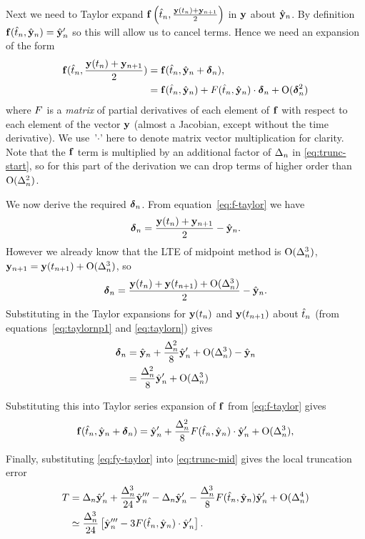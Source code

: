 Next we need to Taylor expand ${\mathbf{f}}\left( \hat{t}_n, \frac{\mathbf{y}(t_n) + \mathbf{y}_{n+1}}{2} \right)$ in $\mathbf{y}$ about $\hat{\mathbf{y}}_n$.
By definition ${\mathbf{f}}(\hat{t}_n, \hat{\mathbf{y}}_n) = \hat{\mathbf{y}}_n'$ so this will allow us to cancel terms.
Hence we need an expansion of the form
\begin{align}
 {\mathbf{f}}(\hat{t}_n, \frac{\mathbf{y}(t_n) + \mathbf{y}_{n+1}}{2}) &= {\mathbf{f}}(\hat{t}_n, \hat{\mathbf{y}}_n + \mbox{\boldmath$\delta$}_{n}),
 \notag \\
 &= {\mathbf{f}}(\hat{t}_n, \hat{\mathbf{y}}_n) + F(\hat{t}_n, \hat{\mathbf{y}}_n) \cdot \mbox{\boldmath$\delta$}_{n}  + \text{O}(\mbox{\boldmath$\delta$}_{n}^2)
 \label{eq:f-taylor}
\end{align}
where $F$ is a \emph{matrix} of partial derivatives of each element of ${\mathbf{f}}$ with respect to each element of the vector $\mathbf{y}$ (\ie almost a Jacobian, except without the time derivative).
We use~'$\cdot$' here to denote matrix vector multiplication for clarity.
Note that the ${\mathbf{f}}$ term is multiplied by an additional factor of $\Delta_{n}$ in \eqref{eq:trunc-start}, so for this part of the derivation we can drop terms of higher order than $\text{O}(\Delta_{n}^2)$.

We now derive the required $\mbox{\boldmath$\delta$}_{n}$.
From equation~\eqref{eq:f-taylor} we have
\begin{equation}
  \mbox{\boldmath$\delta$}_{n} = \frac{\mathbf{y}(t_n) + \mathbf{y}_{n+1}}{2} - \hat{\mathbf{y}}_n.
\end{equation}
However we already know that the LTE of midpoint method is $\text{O}(\Delta_{n}^3)$, \ie $\mathbf{y}_{n+1} = \mathbf{y}(t_{n+1}) + \text{O}(\Delta_{n}^3)$, so
\begin{equation}
   \mbox{\boldmath$\delta$}_{n} = \frac{\mathbf{y}(t_n) + \mathbf{y}(t_{n+1}) + \text{O}(\Delta_{n}^3)}{2} - \hat{\mathbf{y}}_n.
\end{equation}
Substituting in the Taylor expansions for $\mathbf{y}(t_n)$ and $\mathbf{y}(t_{n+1})$ about $\hat{t}_n$ (from equations~\eqref{eq:taylornp1} and \eqref{eq:taylorn}) gives
\begin{align}
  \mbox{\boldmath$\delta$}_{n} &= \hat{\mathbf{y}}_n + \frac{\Delta_{n}^2}{8} \hat{\mathbf{y}}_n' + \text{O}(\Delta_{n}^3) - \hat{\mathbf{y}}_n \notag\\
  &= \frac{\Delta_{n}^2}{8} \hat{\mathbf{y}}_n' + \text{O}(\Delta_{n}^3)
\end{align}

Substituting this into Taylor series expansion of ${\mathbf{f}}$ from \eqref{eq:f-taylor} gives
\begin{equation}
  {\mathbf{f}}(\hat{t}_n, \hat{\mathbf{y}}_n + \mbox{\boldmath$\delta$}_{n}) = \hat{\mathbf{y}}_n'
  + \frac{\Delta_{n}^2}{8} F(\hat{t}_n, \hat{\mathbf{y}}_n) \cdot \hat{\mathbf{y}}_n' + \text{O}(\Delta_{n}^3)
  , \label{eq:fy-taylor}
\end{equation}

Finally, substituting \eqref{eq:fy-taylor} into \eqref{eq:trunc-mid} gives the local truncation error
\begin{align}
  T &= \Delta_{n} \hat{\mathbf{y}}_n' + \frac{\Delta_{n}^3}{24} \hat{\mathbf{y}}_n'''
  - \Delta_{n} \hat{\mathbf{y}}_n'
  - \frac{\Delta_{n}^3}{8} F(\hat{t}_n, \hat{\mathbf{y}}_n) \hat{\mathbf{y}}_n' + \text{O}(\Delta_{n}^4) \notag \\
  &\simeq \frac{\Delta_{n}^3}{24} \left[\hat{\mathbf{y}}_n''' - 3 F(\hat{t}_n, \hat{\mathbf{y}}_n) \cdot \hat{\mathbf{y}}_n' \right].
  \label{eq:trunc-final}
\end{align}

